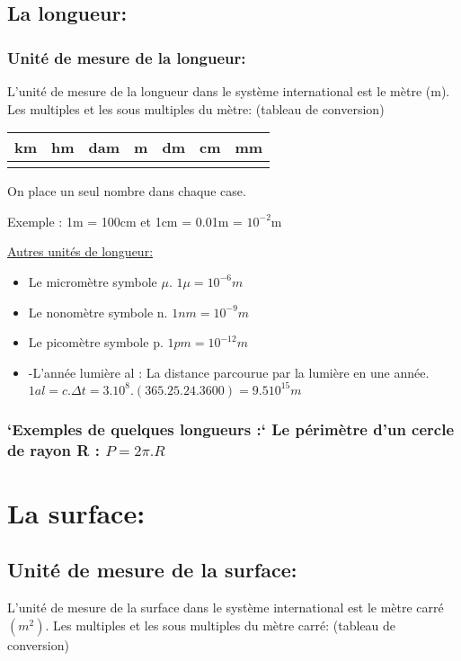 \documentclass[12pt]{article}
\begin{document}
\subsection{La longueur:}
\subsubsection{Unité de mesure de la longueur: }
L'unité de mesure de la longueur dans le système international est le mètre (m).
Les multiples et les sous multiples du mètre: (tableau de conversion)

\begin{center}
   \begin{tabular}{ |c|c|c|c|c|c|c| }
      \hline
      km & hm & dam & \bf{m} & dm & cm & mm \\
      \hline
        &   &    &  &   &   & \\
\hline
\end{tabular}
On place un seul nombre dans chaque case.
\end{center}
Exemple : 1m  =  100cm et 1cm = 0.01m = $10^{-2}$m

\underline{Autres unités de longueur:}

\begin{itemize}
   \item Le micromètre symbole $\mu$. $1\mu = 10^{-6} m$
   \item Le nonomètre symbole n. $1nm = 10^{-9} m$
   \item Le picomètre symbole p. $1pm = 10^{-12} m$
   \item -L’année lumière al : La distance parcourue par la lumière en une année.\\ $1al = c.\Delta{t} = 3.10^{8}.(365.25 . 24. 3600)= 9.5 10^{15}m$
\end{itemize}

\subsubsection{`Exemples de quelques longueurs :` Le périmètre d’un cercle de rayon R : $P = 2\pi.R$}

\section{La surface:}
\subsection{Unité de mesure de la surface: }
L'unité de mesure de la surface dans le système international est le mètre carré $(m^2)$.
Les multiples et les sous multiples du mètre carré: (tableau de conversion)
\end{document}

